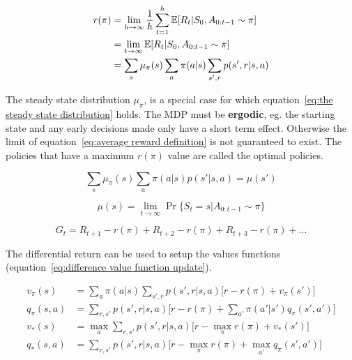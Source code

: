 \begin{equation}
\begin{split}
r(\pi) & = \lim\limits_{h \rightarrow \infty} \frac{1}{h}\sum_{t=1}^{h} \operatorname{\mathbb{E}}[R_t | S_0, A_{0:t-1} \sim \pi] \\
& = \lim_{t \rightarrow \infty} \operatorname{\mathbb{E}}[R_t | S_0, A_{0:t-1} \sim \pi] \\
& = \sum_s \mu_{\pi}(s)\sum_a \pi(a|s) \sum_{s', r}p(s', r| s, a)
\end{split}
\label{eq:average reward definition}
\end{equation}

The steady state distribution $\mu_{\pi}$, is a special case for which equation~\ref{eq:the steady state distribution} holds. The MDP must be \textbf{ergodic}, eg. the starting state and any early decisions made only have a short term effect. Otherwise the limit of equation~\ref{eq:average reward definition} is not guaranteed to exist. The policies that have a maximum $r(\pi)$ value are called the optimal policies.

\begin{equation}
\sum_s \mu_{\pi}(s)\sum_a \pi(a|s) p(s'| s, a)=\mu(s')
\label{eq:the steady state distribution}
\end{equation}

\begin{equation}
\mu(s) = \lim_{t \rightarrow \infty} \Pr\{S_t = s | A_{0:t-1} \sim \pi\} 
\end{equation}

\begin{equation}
G_t = R_{t+1} - r(\pi) + R_{t+2} - r(\pi) + R_{t+3} - r(\pi) + ...
\label{eq:differential return}
\end{equation}

The differential return can be used to setup the values functions (equation~\ref{eq:difference value function update}). 

\begin{equation}
\begin{split}
v_{\pi}(s) & = \sum_a \pi(a|s) \sum_{s',r}p(s',r|s, a)\big[ r - r(\pi) + v_{\pi}(s') \big] \\
q_{\pi}(s, a) & = \sum_{r, s'} p(s', r | s, a)\Big[ r - r(\pi) + \sum_{a'}\pi(a' | s')q_{\pi}(s', a') \Big] \\
v_*(s) & = \max_a \sum_{r, s'} p(s', r | s, a)\Big[ r - \max_{\pi}r(\pi) + v_*(s') \Big] \\
q_*(s, a) & = \sum_{r, s'} p(s', r | s, a)\Big[ r - \max_{\pi}r(\pi) + \max_{a'}q_{\pi}(s', a') \Big] \\
\end{split}
\label{eq:differential value functions}
\end{equation}

